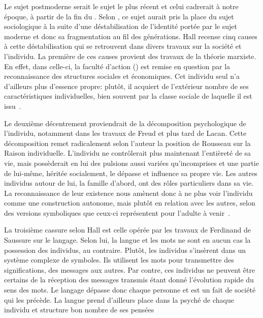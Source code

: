 Le sujet postmoderne serait le sujet le plus récent et celui cadrerait à notre époque, à partir de la fin du . 
Selon \citeauthor{Hall1996a}, ce sujet aurait pris la place du sujet sociologique à la suite d'une déstabilisation de l'identité portée par le sujet moderne et donc sa fragmentation au fil des générations. 
Hall recense cinq causes à cette déstabilisation qui se retrouvent dans divers travaux sur la société et l'individu. 
La première de ces causes provient des travaux de la théorie marxiste. 
En effet, dans celle-ci, la faculté d'action () est remise en question par la reconnaissance des structures sociales et économiques. 
Cet individu seul n'a d'ailleurs plus d'essence propre: plutôt, il acquiert de l'extérieur nombre de ses caractéristiques individuelles, bien souvent par la classe sociale de laquelle il est issu~\citeyearpar[606]{Hall1996a}.

Le deuxième décentrement proviendrait de la décomposition psychologique de l'individu, notamment dans les travaux de Freud et plus tard de Lacan. 
Cette décomposition remet radicalement selon l'auteur la position de Rousseau sur la Raison individuelle. 
L'individu ne contrôlerait plus maintenant l'entièreté de sa vie, mais possèderait en lui des pulsions aussi variées qu'incomprises et une partie de lui-même, héritée socialement, le dépasse et influence sa propre vie. 
Les autres individus autour de lui, la famille d'abord, ont des rôles particuliers dans sa vie.
La reconnaissance de leur existence nous amènent donc à ne plus voir l'individu comme une construction autonome, mais plutôt en relation avec les autres, selon des versions symboliques que ceux-ci représentent pour l'adulte à venir~\citeyearpar[ 607--608]{Hall1996a}.

La troisième cassure selon Hall est celle opérée par les travaux de Ferdinand de Saussure sur le langage. 
Selon lui, la langue et les mots ne sont en aucun cas la possession des individus, au contraire. 
Plutôt, les individus s'insèrent dans un système complexe de symboles. 
Ils utilisent les mots pour transmettre des significations, des messages aux autres. 
Par contre, ces individus ne peuvent être certains de la réception des messages transmis étant donné l'évolution rapide du sens des mots. 
Le langage dépasse donc chaque personne et est un fait de société qui les précède. 
La langue prend d'ailleurs place dans la psyché de chaque individu et structure bon nombre de ses pensées~\citeyearpar[608--609]{Hall1996a}

